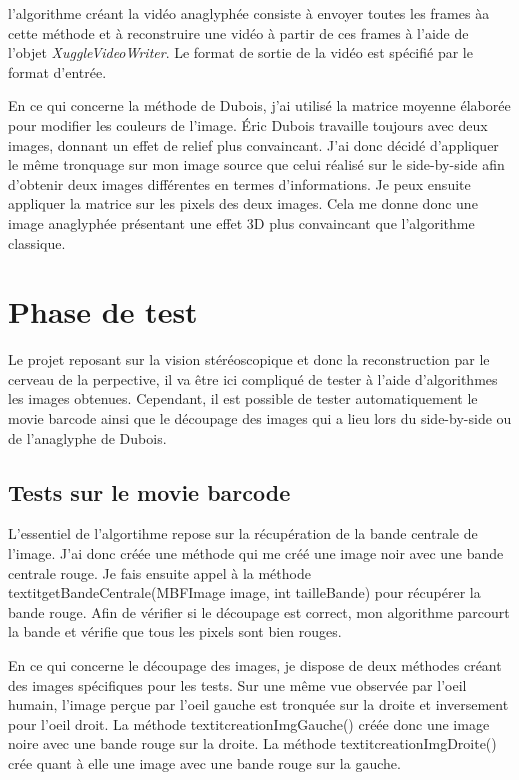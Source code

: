 \documentclass[10pt,a4paper]{article}
\begin{document}
l'algorithme créant la vidéo anaglyphée consiste à envoyer toutes les frames àa cette méthode et à reconstruire une vidéo à partir de ces frames à l'aide de l'objet
\textit{XuggleVideoWriter}. Le format de sortie de la vidéo est spécifié par le format d'entrée.

En ce qui concerne la méthode de Dubois, j'ai utilisé la matrice moyenne élaborée pour modifier les couleurs de l'image. Éric Dubois travaille toujours avec deux images, donnant un effet de relief plus
convaincant. J'ai donc décidé d'appliquer le même tronquage sur mon image source que celui réalisé sur le side-by-side afin d'obtenir deux images différentes en termes d'informations. Je peux ensuite
appliquer la matrice sur les pixels des deux images. Cela me donne donc une image anaglyphée présentant une effet 3D plus convaincant que l'algorithme classique.

\section{Phase de test}

Le projet reposant sur la vision stéréoscopique et donc la reconstruction par le cerveau de la perpective, il va être ici compliqué de tester à l'aide d'algorithmes les images obtenues. Cependant, il est possible de tester automatiquement le movie barcode ainsi que le découpage des images qui a lieu lors du side-by-side ou de l'anaglyphe de Dubois. 

\subsection{Tests sur le movie barcode}

L'essentiel de l'algortihme repose sur la récupération de la bande centrale de l'image. J'ai donc créée une méthode qui me créé une image noir avec une bande centrale rouge. Je fais ensuite appel à la méthode textit{getBandeCentrale(MBFImage image, int tailleBande)} pour récupérer la bande rouge. Afin de vérifier si le découpage est correct, mon algorithme parcourt la bande et vérifie que tous les pixels sont bien rouges. 

En ce qui concerne le découpage des images, je dispose de deux méthodes créant des images spécifiques pour les tests. Sur une même vue observée par l'oeil humain, l'image perçue par l'oeil gauche est tronquée sur la droite et inversement pour l'oeil droit. La méthode textit{creationImgGauche()} créée donc une image noire avec une bande rouge sur la droite. La méthode textit{creationImgDroite()} crée quant à elle une image avec une bande rouge sur la gauche.
\end{document}
